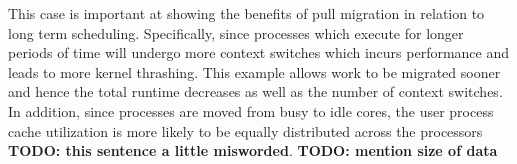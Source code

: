 \documentclass[11pt, twocolumn]{proc}
\begin{document}
This case is important at showing the benefits of pull migration in relation to long term scheduling.  Specifically, since processes which execute for longer periods of time will undergo more context switches which incurs performance and leads to more kernel thrashing.  This example allows work to be migrated sooner and hence the total runtime decreases as well as the number of context switches.  In addition, since processes are moved from busy to idle cores, the user process cache utilization is more likely to be equally distributed across the processors \textbf{TODO: this sentence a little misworded}.  \textbf{TODO: mention size of data}

\begin{table}[h!]
    \centering
    \caption{pool - unpooled sm}
\end{table}

\begin{table}[h!]
    \centering
    \caption{pool - pooled sm}
\end{table}
\end{document}
